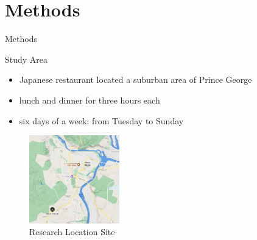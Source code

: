 \documentclass[
  ignorenonframetext,
]{beamer}
\providecommand{\tightlist}{%
  \setlength{\itemsep}{0pt}\setlength{\parskip}{0pt}}
\begin{document}
\hypertarget{methods}{%
\section{Methods}\label{methods}}

\begin{frame}{Methods}
\protect\hypertarget{methods-1}{}
\begin{block}{Study Area}
\protect\hypertarget{study-area}{}
\begin{itemize}
\tightlist
\item
  Japanese restaurant located a suburban area of Prince George
\item
  lunch and dinner for three hours each
\item
  six days of a week: from Tuesday to Sunday
\end{itemize}

\begin{figure}
\centering
\includegraphics[width=0.35\textwidth,height=\textheight]{sendoMap.png}
\caption{Research Location Site}
\end{figure}
\end{block}
\end{frame}
\end{document}
